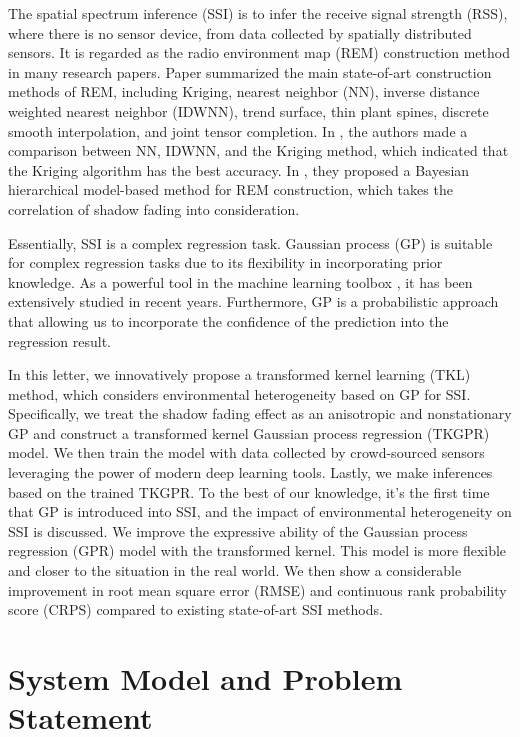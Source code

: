 \documentclass[12pt, draftclsenofoot, oneside, onecolumn]{IEEEtran}
\begin{document}
The spatial spectrum inference (SSI) is to infer the receive signal strength (RSS), where there is no sensor device, from data collected by spatially distributed sensors. It is regarded as the radio environment map (REM) construction method in many research papers\cite{Phillips2012, Pesko2014, Sato2017, Li2018, Han2019, Katagiri2020, Xu2021}. Paper\cite{Li2018} summarized the main state-of-art construction methods of REM, including Kriging, nearest neighbor (NN), inverse distance weighted nearest neighbor (IDWNN), trend surface, thin plant spines, discrete smooth interpolation, and joint tensor completion. In \cite{Han2019}, the authors made a comparison between NN, IDWNN, and the Kriging method, which indicated that the Kriging algorithm has the best accuracy. In \cite{Xu2021}, they proposed a Bayesian hierarchical model-based method for REM construction, which takes the correlation of shadow fading into consideration. 

Essentially, SSI is a complex regression task. Gaussian process (GP) is suitable for complex regression tasks due to its flexibility in incorporating prior knowledge. As a powerful tool in the machine learning toolbox \cite{Rasmussen2006}, it has been extensively studied in recent years\cite{Damianou2013, Wilson2013, Duvenaud2014a, Salimbeni2017a, Lee2018, Wilson2019}.  Furthermore, GP is a probabilistic approach that allowing us to incorporate the confidence of the prediction into the regression result.

In this letter, we innovatively propose a transformed kernel learning (TKL) method, which considers environmental heterogeneity based on GP for SSI. Specifically, we treat the shadow fading effect as an anisotropic and nonstationary GP and construct a transformed kernel Gaussian process regression (TKGPR) model. We then train the model with data collected by crowd-sourced sensors leveraging the power of modern deep learning tools. Lastly, we make inferences based on the trained TKGPR. To the best of our knowledge, it's the first time that GP is introduced into SSI, and the impact of environmental heterogeneity on SSI is discussed. We improve the expressive ability of the Gaussian process regression (GPR) model with the transformed kernel. This model is more flexible and closer to the situation in the real world. We then show a considerable improvement in root mean square error (RMSE) and continuous rank probability score (CRPS)\cite{Gneiting2007} compared to existing state-of-art SSI methods.

\section{System Model and Problem Statement}
\end{document}
